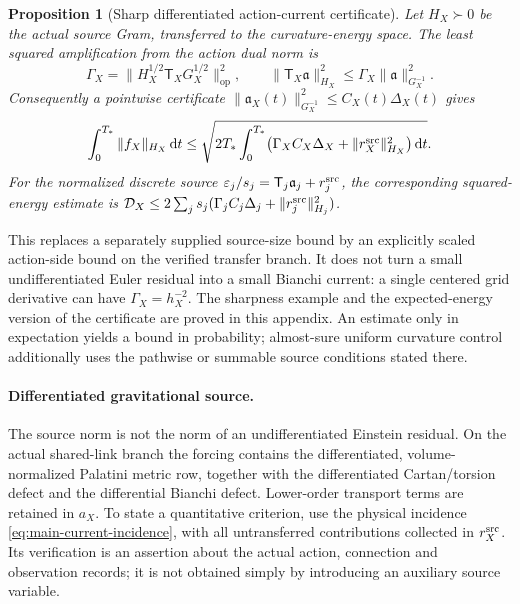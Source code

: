 \documentclass[11pt]{article}
\numberwithin{equation}{section}
\newtheorem{proposition}[proposition]{Proposition}
\theoremstyle{definition}
\theoremstyle{remark}
\newcommand{\dd}{\mathrm d}
\newcommand{\op}{\mathrm{op}}
\begin{document}
\begin{proposition}[Sharp differentiated action-current certificate]
\label{prop:main-action-current}
Let $H_X\succ0$ be the actual source Gram, transferred to the curvature-energy
space.  The least squared amplification from the action dual norm is
\begin{equation}
 \Gamma_X
   =\|H_X^{1/2}\mathsf T_XG_X^{1/2}\|_{\op}^2,\qquad
 \|\mathsf T_X\mathfrak a\|_{H_X}^2
       \le\Gamma_X\|\mathfrak a\|_{G_X^{-1}}^2.
 \label{eq:main-sharp-current-transfer}
\end{equation}
Consequently a pointwise certificate
$\|\mathfrak a_X(t)\|_{G_X^{-1}}^2\le C_X(t)\Delta_X(t)$ gives
\begin{equation}
 \int_0^{T_*}\|f_X\|_{H_X}\,\dd t
 \le\sqrt{2T_*\int_0^{T_*}
       \bigl(\Gamma_XC_X\Delta_X+
                         \|r_X^{\rm src}\|_{H_X}^2\bigr)\,\dd t}.
 \label{eq:main-action-source-budget}
\end{equation}
For the normalized discrete source
$\varepsilon_j/s_j=\mathsf T_j\mathfrak a_j+r_j^{\rm src}$, the
corresponding squared-energy estimate is
$\mathcal D_X\le2\sum_js_j(\Gamma_jC_j\Delta_j+
\|r_j^{\rm src}\|_{H_j}^2)$.
\end{proposition}

This replaces a separately supplied source-size bound by an explicitly scaled
action-side bound on the verified transfer branch.  It does not turn a small
undifferentiated Euler residual into a small Bianchi current: a single centered
grid derivative can have $\Gamma_X=h_X^{-2}$.  The sharpness example and the
expected-energy version of the certificate are proved in
this appendix.  An estimate only in expectation yields a bound
in probability; almost-sure uniform curvature control additionally uses the
pathwise or summable source conditions stated there.

\paragraph{Differentiated gravitational source.}
The source norm is not the norm of an undifferentiated Einstein residual.
On the actual shared-link branch the forcing contains the differentiated,
volume-normalized Palatini metric row, together with the differentiated
Cartan/torsion defect and the differential Bianchi defect.  Lower-order
transport terms are retained in $a_X$.  To state a quantitative criterion,
use the physical incidence \eqref{eq:main-current-incidence}, with all
untransferred contributions collected in $r_X^{\rm src}$.  Its verification
is an assertion about the actual action, connection and observation records;
it is not obtained simply by introducing an auxiliary source variable.
\end{document}
